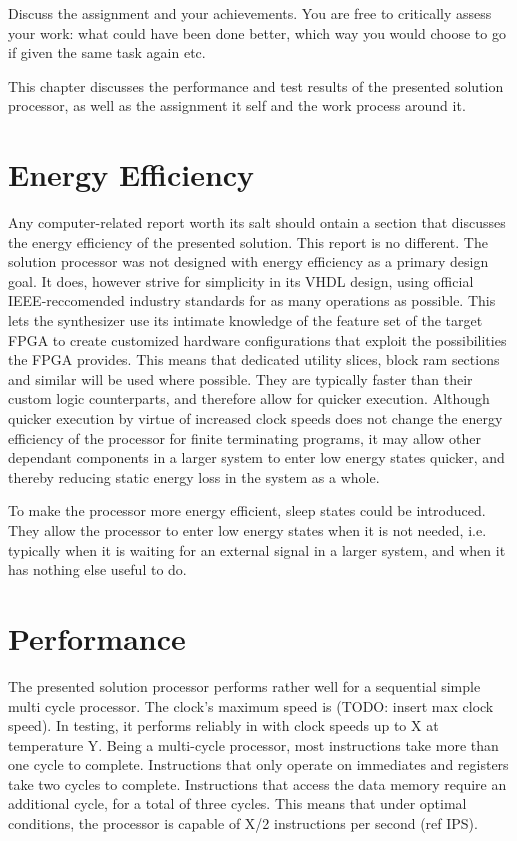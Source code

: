 Discuss the assignment and your achievements.
You are free to critically assess your work:
what could have been done better, which way you would choose to go if given the same task again etc.

This chapter discusses the performance and test results of the presented solution processor, as well as the assignment it self and the work process around it.


\section{Energy Efficiency}

Any computer-related report worth its salt should ontain a section that discusses the energy efficiency of the presented solution.
This report is no different.
The solution processor was not designed with energy efficiency as a primary design goal.
It does, however strive for simplicity in its VHDL design, using official IEEE-reccomended industry standards for as many operations as possible.
This lets the synthesizer use its intimate knowledge of the feature set of the target FPGA to create customized hardware configurations that exploit the possibilities the FPGA provides.
This means that dedicated utility slices, block ram sections and similar will be used where possible.
They are typically faster than their custom logic counterparts, and therefore allow for quicker execution.
Although quicker execution by virtue of increased clock speeds does not change the energy efficiency of the processor for finite terminating programs, it may allow other dependant components in a larger system to enter low energy states quicker, and thereby reducing static energy loss in the system as a whole.

To make the processor more energy efficient, sleep states could be introduced.
They allow the processor to enter low energy states when it is not needed, i.e. typically when it is waiting for an external signal in a larger system, and when it has nothing else useful to do.


\section{Performance}

The presented solution processor performs rather well for a sequential simple multi cycle processor.
The clock's maximum speed is (TODO: insert max clock speed).
In testing, it performs reliably in with clock speeds up to X at temperature Y.
Being a multi-cycle processor, most instructions take more than one cycle to complete.
Instructions that only operate on immediates and registers take two cycles to complete.
Instructions that access the data memory require an additional cycle, for a total of three cycles.
This means that under optimal conditions, the processor is capable of X/2 instructions per second (ref IPS).

